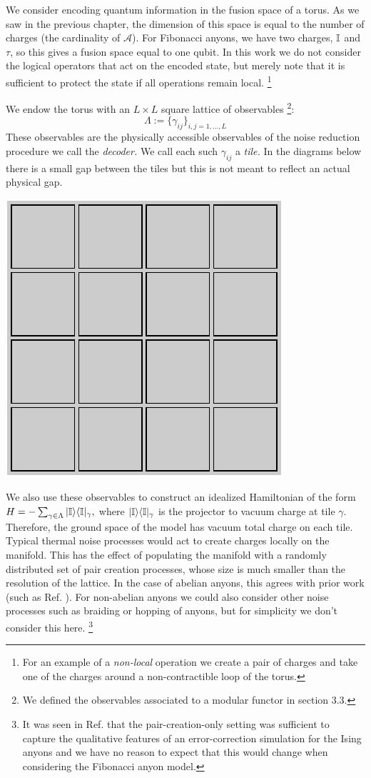 We consider encoding quantum information in the fusion space of a torus.
As we saw in the previous chapter, 
the dimension of this space is equal to the number of
charges (the cardinality of $\mathcal{A}$).
For Fibonacci anyons, we have two charges, $\mathbb{I}$ and $\tau$,
so this gives a fusion space equal to one qubit.
In this work we do not consider the logical operators that
act on the encoded state, but merely note that it is sufficient
to protect the state if all operations remain local.
\footnote{For an example of a \emph{non-local} operation we
create a pair of charges and take one of the charges around
a non-contractible loop of the torus.}

We endow the torus with an $L\times L$ square lattice of observables
\footnote{We defined the observables associated to a modular functor in section 3.3.}:
$$
    \Lambda := \bigl\{ \gamma_{ij} \bigr\}_{i,j=1,...,L}
$$
These observables are the physically accessible observables of
the noise reduction procedure we call the \emph{decoder.}
We call each such $\gamma_{ij}$ a \emph{tile.}
In the diagrams below 
there is a small gap between the tiles but this is not meant
to reflect an actual physical gap.
\begin{center}
\includegraphics[width=0.3\columnwidth ]{pic-torus-tiles.pdf}
\end{center}

We also use these observables to construct an
idealized Hamiltonian of the form
$H = -\sum_{\gamma\in\Lambda} |{\mathbb{I}}\rangle\langle{\mathbb{I}}|_\gamma,$
where $|{\mathbb{I}}\rangle\langle{\mathbb{I}}|_\gamma$ is the projector to vacuum charge
at tile $\gamma.$ Therefore, the ground space of the model has
vacuum total charge on each tile.
Typical thermal noise processes would act to
create charges locally on the manifold.
This has the effect of
populating the manifold with
a randomly distributed set of pair creation processes,
whose size is much smaller than the resolution of the lattice.
In the case of abelian anyons, this agrees with
prior work (such as Ref. \cite{Dennis2002}).
For non-abelian anyons we could also consider other
noise processes such as braiding or hopping of anyons, but for
simplicity we don't consider this here.
\footnote{It was seen in Ref. \cite{Brell2013} that the pair-creation-only setting was sufficient to capture the qualitative features of an error-correction simulation for the Ising anyons and we have no reason to expect that this would change when considering the Fibonacci anyon model.}

